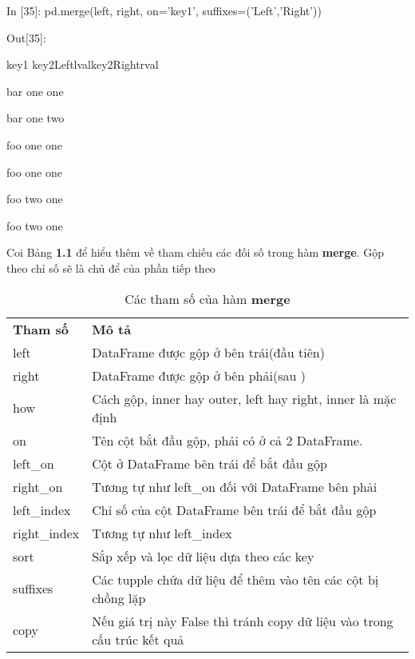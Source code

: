 \quad\textup{In [35]: pd.merge(left, right, on='key1', suffixes=('Left','Right'))}\par
    \quad\textup{Out[35]:}\par
    \quad\quad\textup{ key1 key2Left\quad lval\quad key2Right\quad rval } \par
     \quad bar \quad \quad one \quad {} \quad \quad \quad one \quad {} \par
    \quad bar \quad \quad one \quad {} \quad \quad \quad two \quad {} \par
     \quad foo \quad \quad one \quad {} \quad \quad \quad one \quad {} \par
    \quad foo \quad \quad one \quad {} \quad \quad \quad one \quad {} \par
    \quad foo \quad \quad two \quad {} \quad \quad \quad one \quad {} \par
    \quad foo \quad \quad two \quad {} \quad \quad \quad one \quad {} \\ \par
Coi Bảng \textbf{1.1} để hiểu thêm về tham chiếu các đối số trong hàm \textbf{merge}. Gộp theo chỉ số sẽ là chủ để của phần tiếp theo  \par

\begin{table}[h]
\centering
    \begin{tabular}{l|p{10cm}}
      \textbf{ Tham số}  & \textbf{Mô tả} \\
left & DataFrame được gộp ở bên trái(đầu tiên) \\ 
right & DataFrame được gộp ở bên phải(sau )\\
how & Cách gộp, inner hay outer, left hay right, inner là mặc định  \\
on     &  Tên cột bắt đầu gộp, phải có ở cả 2 DataFrame.\\
left\_on   & Cột ở DataFrame bên trái để bắt đầu gộp \\
right\_on & Tương tự như left\_on đối với DataFrame bên phải  \\
left\_index   &  Chỉ số của cột DataFrame bên trái để bắt đầu gộp \\
right\_index & Tương tự như left\_index \\
sort  & Sắp xếp và lọc dữ liệu dựa theo các key \\
suffixes  & Các tupple chứa dữ liệu để thêm vào tên các cột bị chồng lặp \\
copy & Nếu giá trị này False thì tránh copy dữ liệu vào trong cấu trúc kết quả 
    \end{tabular}
    \caption{Các tham số của hàm \textbf{merge}}
    \label{tab:table1}
\end{table}


